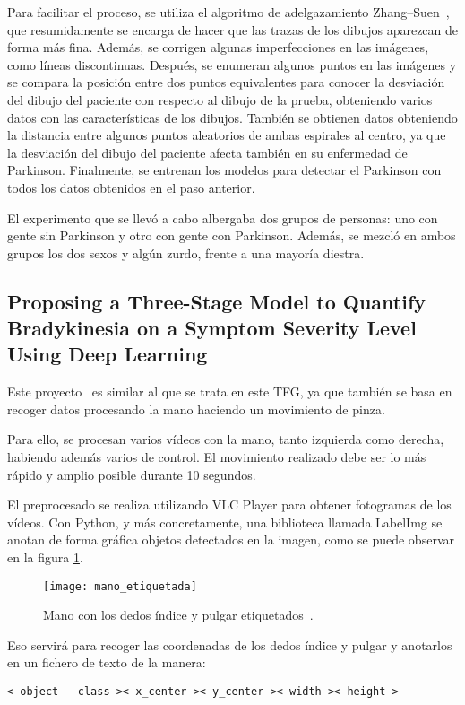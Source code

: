 Para facilitar el proceso, se utiliza el algoritmo de adelgazamiento Zhang–Suen~\cite{zhang1984fast}, que resumidamente se encarga de hacer que las trazas de los dibujos aparezcan de forma más fina. Además, se corrigen algunas imperfecciones en las imágenes, como líneas discontinuas. Después, se enumeran algunos puntos en las imágenes y se compara la posición entre dos puntos equivalentes para conocer la desviación del dibujo del paciente con respecto al dibujo de la prueba, obteniendo varios datos con las características de los dibujos. También se obtienen datos obteniendo la distancia entre algunos puntos aleatorios de ambas espirales al centro, ya que la desviación del dibujo del paciente afecta también en su enfermedad de Parkinson. Finalmente, se entrenan los modelos para detectar el Parkinson con todos los datos obtenidos en el paso anterior.

El experimento que se llevó a cabo albergaba dos grupos de personas: uno con gente sin Parkinson y otro con gente con Parkinson. Además, se mezcló en ambos grupos los dos sexos y algún zurdo, frente a una mayoría diestra.

\subsection{Proposing a Three-Stage Model to Quantify
	Bradykinesia on a Symptom Severity Level
	Using Deep Learning}
Este proyecto~\cite{jaber2021proposing} es similar al que se trata en este TFG, ya que también se basa en recoger datos procesando la mano haciendo un movimiento de pinza.

Para ello, se procesan varios vídeos con la mano, tanto izquierda como derecha, habiendo además varios de control. El movimiento realizado debe ser lo más rápido y amplio posible durante 10 segundos.

El preprocesado se realiza utilizando VLC Player para obtener fotogramas de los vídeos. Con Python, y más concretamente, una biblioteca llamada LabelImg se anotan de forma gráfica objetos detectados en la imagen, como se puede observar en la figura \ref{fig:manoetiquetada}.

\begin{figure}[]
	\texttt{[image: mano\_etiquetada]}
	\caption{Mano con los dedos índice y pulgar etiquetados~\cite{jaber2021proposing}.}
	\label{fig:manoetiquetada}
\end{figure}

Eso servirá para recoger las coordenadas de los dedos índice y pulgar y anotarlos en un fichero de texto de la manera:
\begin{center}
	\texttt{< object - class >< x\_center >< y\_center >< width >< height >}
\end{center}

